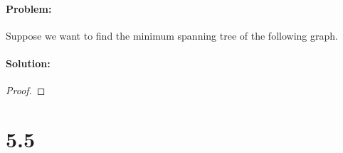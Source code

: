 \documentclass[12pt]{article}
\begin{document}
\paragraph{Problem:}
Suppose we want to find the minimum spanning tree of the following graph.

\begin{comment}
\begin{tikzpicture}[->,>=stealth',shorten >=1pt,auto,node distance=3cm,
  thick,main node/.style={circle,fill=blue!20,draw,font=\sffamily\Large\bfseries}]
  \node[main node] (a) {a};
  \node[main node] (b) [right of=a]{b};
  \node[main node] (c) [right of=b]{c};
  \node[main node] (d) [right of=c]{d};
  \node[main node] (e) [below of=a]{e};
  \node[main node] (f) [below of=b]{f};
  \node[main node] (g) [below of=c]{g};
  \node[main node] (h) [below of=d]{h};
  \tikzset{LabelStyle/.style =   {draw,
				  fill           = yellow,
				  text           = red}}
  \path[every node/.style={font=\sffamily\small}]
  \draw[EdgeStyle](a) to node[LabelStyle]{1} (b);
  \draw[EdgeStyle](a) to node[LabelStyle]{8} (f);
  \draw[EdgeStyle](a) to node[LabelStyle]{4} (e);
  \draw[EdgeStyle](b) to node[LabelStyle]{2} (c);
  \draw[EdgeStyle](b) to node[LabelStyle]{6} (g);
  \draw[EdgeStyle](b) to node[LabelStyle]{6} (f);
  \draw[EdgeStyle](c) to node[LabelStyle]{3} (d);
  \draw[EdgeStyle](c) to node[LabelStyle]{2} (g);
  \draw[EdgeStyle](d) to node[LabelStyle]{1} (g);
  \draw[EdgeStyle](d) to node[LabelStyle]{4} (h);
  \draw[EdgeStyle](e) to node[LabelStyle]{5} (f);
  \draw[EdgeStyle](f) to node[LabelStyle]{1} (g);
  \draw[EdgeStyle](g) to node[LabelStyle]{1} (h);
\end{tikzpicture}
(a) Run Prim’s algorithm; whenever there is a choice of nodes, always use alphabetic ordering
(e.g., start from node A). Draw a table showing the intermediate values of the cost array.
(b) Run Kruskal’s algorithm on the same graph. Show how the disjoint-sets data structure
looks at every intermediate stage (including the structure of the directed trees), assuming
path compression is used.
\end{comment}

\paragraph{Solution:}
\begin{proof}
\end{proof}


\section*{5.5}
\end{document}
